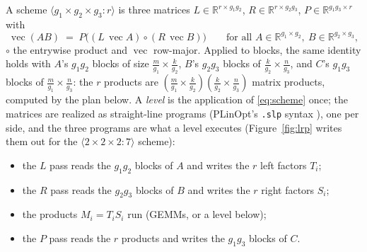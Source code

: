 \documentclass[11pt]{article}
\newcommand{\R}{\mathbb{R}}
\newcommand{\mm}[1]{\langle #1\rangle}
\newcommand{\vect}{\operatorname{vec}}
\begin{document}
A scheme $\mm{g_1\times g_2\times g_3:r}$ is three matrices $L\in\R^{r\times
g_1g_2}$, $R\in\R^{r\times g_2g_3}$, $P\in\R^{g_1g_3\times r}$ with
\begin{equation}\label{eq:scheme}
\vect(AB) \;=\; P\bigl((L\,\vect A)\circ(R\,\vect B)\bigr)
\qquad\text{for all } A\in\R^{g_1\times g_2},\ B\in\R^{g_2\times g_3},
\end{equation}
$\circ$ the entrywise product and $\vect$ row-major.  Applied to blocks, the
same identity holds with $A$'s $g_1g_2$ blocks of size $\frac{m}{g_1}\times
\frac{k}{g_2}$, $B$'s $g_2g_3$ blocks of $\frac{k}{g_2}\times\frac{n}{g_3}$,
and $C$'s $g_1g_3$ blocks of $\frac{m}{g_1}\times\frac{n}{g_3}$: the $r$
products are $(\frac{m}{g_1}\times\frac{k}{g_2})(\frac{k}{g_2}\times
\frac{n}{g_3})$ matrix products, computed by the plan below.  A \emph{level} is
the application of \eqref{eq:scheme} once; the matrices are realized as
straight-line programs (PLinOpt's \texttt{.slp} syntax \cite{PLinOpt}), one
per side, and the three programs are what a level executes
(Figure~\ref{fig:lrp} writes them out for the $\mm{2\times2\times2:7}$ scheme):
\begin{itemize}
\item the $L$ pass reads the $g_1g_2$ blocks of $A$ and writes the $r$ left
  factors $T_i$;
\item the $R$ pass reads the $g_2g_3$ blocks of $B$ and writes the $r$ right
  factors $S_i$;
\item the products $M_i=T_iS_i$ run (GEMMs, or a level below);
\item the $P$ pass reads the $r$ products and writes the $g_1g_3$ blocks of $C$.
\end{itemize}
\end{document}
